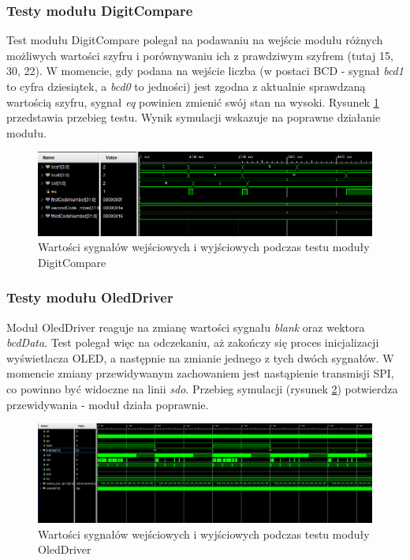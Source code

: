 \documentclass[12pt] {article}
\begin{document}
\subsubsection{Testy modułu DigitCompare}
Test modułu DigitCompare polegał na podawaniu na wejście modułu różnych możliwych wartości szyfru i porównywaniu ich z prawdziwym szyfrem (tutaj 15, 30, 22). W momencie, gdy podana na wejście liczba (w postaci BCD - sygnał \textit{bcd1} to cyfra dziesiątek, a \textit{bcd0} to jedności) jest zgodna z aktualnie sprawdzaną wartością szyfru, sygnał \textit{eq} powinien zmienić swój stan na wysoki. Rysunek \ref{fig:behavDigitCompare} przedstawia przebieg testu. Wynik symulacji wskazuje na poprawne działanie modułu.

\begin{figure}[H]
\centering
\includegraphics[width=\textwidth]{res/behav_sims/DigitCompare_behavSim_1.png}
\caption{Wartości sygnałów wejściowych i wyjściowych podczas testu moduły DigitCompare}
\label{fig:behavDigitCompare}
\end{figure}

\subsubsection{Testy modułu OledDriver}
Moduł OledDriver reaguje na zmianę wartości sygnału \textit{blank} oraz wektora \textit{bcdData}. Test polegał więc na odczekaniu, aż zakończy się proces inicjalizacji wyświetlacza OLED, a następnie na zmianie jednego z tych dwóch sygnałów. W momencie zmiany przewidywanym zachowaniem jest nastąpienie transmisji SPI, co powinno być widoczne na linii \textit{sdo}. Przebieg symulacji (rysunek \ref{fig:behavOledDriver}) potwierdza przewidywania - moduł działa poprawnie.

\begin{figure}[H]
\centering
\includegraphics[width=\textwidth]{res/behav_sims/OledDriver_behavSim_1.png}
\caption{Wartości sygnałów wejściowych i wyjściowych podczas testu moduły OledDriver}
\label{fig:behavOledDriver}
\end{figure}
\end{document}
